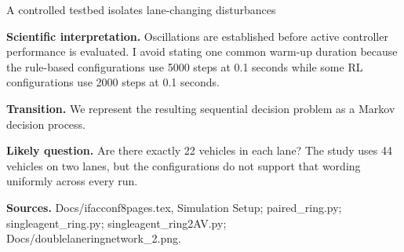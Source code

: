 \documentclass[aspectratio=169,11pt]{beamer}
\begin{document}
\begin{frame}[shrink=8]{A controlled testbed isolates lane-changing disturbances}
{    \textbf{Scientific interpretation.} Oscillations are established before active controller performance is evaluated. I avoid stating one common warm-up duration because the rule-based configurations use 5000 steps at 0.1 seconds while some RL configurations use 2000 steps at 0.1 seconds.

    \textbf{Transition.} We represent the resulting sequential decision problem as a Markov decision process.

    \textbf{Likely question.} Are there exactly 22 vehicles in each lane? The study uses 44 vehicles on two lanes, but the configurations do not support that wording uniformly across every run.

    \textbf{Sources.} Docs/ifacconf8pages.tex, Simulation Setup; paired\_ring.py; singleagent\_ring.py; singleagent\_ring2AV.py; Docs/doublelaneringnetwork\_2.png.
  }
\end{frame}
\end{document}
